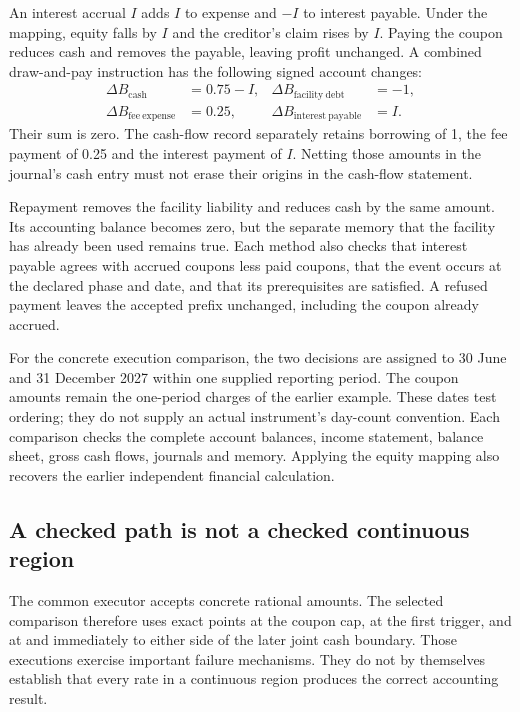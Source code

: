 An interest accrual $I$ adds $I$ to expense and $-I$ to interest payable. Under the mapping, equity falls by $I$ and the creditor's claim rises by $I$. Paying the coupon reduces cash and removes the payable, leaving profit unchanged. A combined draw-and-pay instruction has the following signed account changes:
\begin{align}
 \Delta B_{\mathrm{cash}}&=0.75-I,&
 \Delta B_{\mathrm{facility\ debt}}&=-1,\\
 \Delta B_{\mathrm{fee\ expense}}&=0.25,&
 \Delta B_{\mathrm{interest\ payable}}&=I.
\end{align}
Their sum is zero. The cash-flow record separately retains borrowing of 1, the fee payment of 0.25 and the interest payment of $I$. Netting those amounts in the journal's cash entry must not erase their origins in the cash-flow statement.

Repayment removes the facility liability and reduces cash by the same amount. Its accounting balance becomes zero, but the separate memory that the facility has already been used remains true. Each method also checks that interest payable agrees with accrued coupons less paid coupons, that the event occurs at the declared phase and date, and that its prerequisites are satisfied. A refused payment leaves the accepted prefix unchanged, including the coupon already accrued.

For the concrete execution comparison, the two decisions are assigned to 30 June and 31 December 2027 within one supplied reporting period. The coupon amounts remain the one-period charges of the earlier example. These dates test ordering; they do not supply an actual instrument's day-count convention. Each comparison checks the complete account balances, income statement, balance sheet, gross cash flows, journals and memory. Applying the equity mapping also recovers the earlier independent financial calculation.

\subsection{A checked path is not a checked continuous region}

The common executor accepts concrete rational amounts. The selected comparison therefore uses exact points at the coupon cap, at the first trigger, and at and immediately to either side of the later joint cash boundary. Those executions exercise important failure mechanisms. They do not by themselves establish that every rate in a continuous region produces the correct accounting result.

